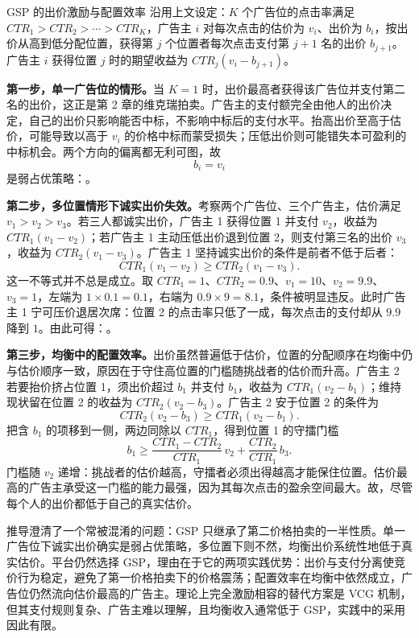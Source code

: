 \begin{derivation}{GSP 的出价激励与配置效率}{}
沿用上文设定：$K$ 个广告位的点击率满足 $CTR_1 > CTR_2 > \cdots > CTR_K$，广告主 $i$ 对每次点击的估价为 $v_i$、出价为 $b_i$，按出价从高到低分配位置，获得第 $j$ 个位置者每次点击支付第 $j+1$ 名的出价 $b_{j+1}$。广告主 $i$ 获得位置 $j$ 时的期望收益为 $CTR_j(v_i - b_{j+1})$。

\textbf{第一步，单一广告位的情形。}当 $K=1$ 时，出价最高者获得该广告位并支付第二名的出价，这正是第 2 章的维克瑞拍卖。广告主的支付额完全由他人的出价决定，自己的出价只影响能否中标，不影响中标后的支付水平。抬高出价至高于估价，可能导致以高于 $v_i$ 的价格中标而蒙受损失；压低出价则可能错失本可盈利的中标机会。两个方向的偏离都无利可图，故
\[
b_i = v_i
\]
是弱占优策略：。

\textbf{第二步，多位置情形下诚实出价失效。}考察两个广告位、三个广告主，估价满足 $v_1 > v_2 > v_3$。若三人都诚实出价，广告主 1 获得位置 1 并支付 $v_2$，收益为 $CTR_1(v_1 - v_2)$；若广告主 1 主动压低出价退到位置 2，则支付第三名的出价 $v_3$，收益为 $CTR_2(v_1 - v_3)$。广告主 1 坚持诚实出价的条件是前者不低于后者：
\[
CTR_1(v_1 - v_2) \geq CTR_2(v_1 - v_3).
\]
这一不等式并不总是成立。取 $CTR_1 = 1$、$CTR_2 = 0.9$、$v_1 = 10$、$v_2 = 9.9$、$v_3 = 1$，左端为 $1 \times 0.1 = 0.1$，右端为 $0.9 \times 9 = 8.1$，条件被明显违反。此时广告主 1 宁可压价退居次席：位置 2 的点击率只低了一成，每次点击的支付却从 $9.9$ 降到 $1$。由此可得：。

\textbf{第三步，均衡中的配置效率。}出价虽然普遍低于估价，位置的分配顺序在均衡中仍与估价顺序一致，原因在于守住高位置的门槛随挑战者的估价而升高。广告主 2 若要抬价挤占位置 1，须出价超过 $b_1$ 并支付 $b_1$，收益为 $CTR_1(v_2 - b_1)$；维持现状留在位置 2 的收益为 $CTR_2(v_2 - b_3)$。广告主 2 安于位置 2 的条件为
\[
CTR_2(v_2 - b_3) \geq CTR_1(v_2 - b_1).
\]
把含 $b_1$ 的项移到一侧，两边同除以 $CTR_1$，得到位置 1 的守擂门槛
\[
b_1 \geq \frac{CTR_1 - CTR_2}{CTR_1}\,v_2 + \frac{CTR_2}{CTR_1}\,b_3.
\]
门槛随 $v_2$ 递增：挑战者的估价越高，守擂者必须出得越高才能保住位置。估价最高的广告主承受这一门槛的能力最强，因为其每次点击的盈余空间最大。故，尽管每个人的出价都低于自己的真实估价。
\end{derivation}

推导澄清了一个常被混淆的问题：GSP 只继承了第二价格拍卖的一半性质。单一广告位下诚实出价确实是弱占优策略，多位置下则不然，均衡出价系统性地低于真实估价。平台仍然选择 GSP，理由在于它的两项实践优势：出价与支付分离使竞价行为稳定，避免了第一价格拍卖下的价格震荡；配置效率在均衡中依然成立，广告位仍然流向估价最高的广告主。理论上完全激励相容的替代方案是 VCG 机制，但其支付规则复杂、广告主难以理解，且均衡收入通常低于 GSP，实践中的采用因此有限。


